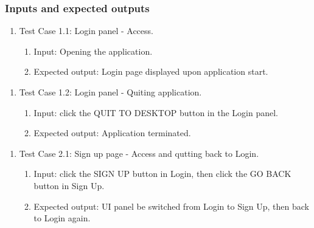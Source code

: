\documentclass[11pt]{article}
\begin{document}
    \subsubsection*{Inputs and expected outputs}
    \begin{enumerate}
        \item Test Case 1.1: Login panel - Access.
        \begin{enumerate}
            \item  Input: Opening the application.
            \item  Expected output: Login page displayed upon application start.
        \end{enumerate}
    \end{enumerate}
    \begin{enumerate}
        \item Test Case 1.2: Login panel - Quiting application.
        \begin{enumerate}
            \item  Input: click the QUIT TO DESKTOP button in the Login panel.
            \item  Expected output: Application terminated.
        \end{enumerate}
    \end{enumerate}
    \begin{enumerate}
        \item Test Case 2.1: Sign up page - Access and qutting back to Login.
        \begin{enumerate}
            \item  Input: click the SIGN UP button in Login, then click the GO BACK button in Sign Up.
            \item  Expected output: UI panel be switched from Login to Sign Up, then back to Login again.
        \end{enumerate}
    \end{enumerate}
    
\end{document}
